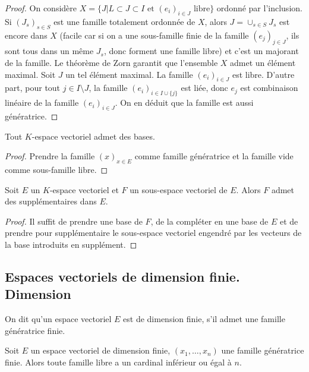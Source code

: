 \begin{proof}
On considère $X = \{J | L \subset J \subset I \text{ et } (e_i)_{i\in J} \text{ libre}\}$ ordonné par l'inclusion. Si $(J_s)_{s\in S}$ est une famille totalement ordonnée de $X$, alors $J = \cup_{s\in S} J_s$ est encore dans $X$ (facile car si on a une sous-famille finie de la famille $(e_j)_{j\in J}$, ils sont tous dans un même $J_s$, donc forment une famille libre) et c'est un majorant de la famille. Le théorème de Zorn garantit que l'ensemble $X$ admet un élément maximal. Soit $J$ un tel élément maximal. La famille $(e_i)_{i\in J}$ est libre. D'autre part, pour tout $j \in I \setminus J$, la famille $(e_i)_{i\in I \cup \{j\}}$ est liée, donc $e_j$ est combinaison linéaire de la famille $(e_i)_{i\in J}$. On en déduit que la famille est aussi génératrice.
\end{proof}

\begin{thm}
Tout $K$-espace vectoriel admet des bases.
\end{thm}

\begin{proof}
Prendre la famille $(x)_{x\in E}$ comme famille génératrice et la famille vide comme sous-famille libre.
\end{proof}

\begin{thm}
Soit $E$ un $K$-espace vectoriel et $F$ un  sous-espace vectoriel de $E$. Alors $F$ admet des  supplémentaires dans $E$.
\end{thm}

\begin{proof}
Il suffit de prendre une base de $F$, de la compléter en une base de $E$ et de prendre pour supplémentaire le sous-espace vectoriel engendré par les vecteurs de la base introduits en supplément.
\end{proof}

\subsection{Espaces vectoriels de dimension finie. Dimension}

\begin{de}
On dit qu'un espace vectoriel $E$ est de dimension finie, s'il admet une famille génératrice finie.
\end{de}

\begin{lem}
Soit $E$ un espace vectoriel de dimension finie, $(x_1,\ldots,x_n)$ une famille génératrice finie. Alors toute famille libre a un cardinal inférieur ou égal à $n$.
\end{lem}

